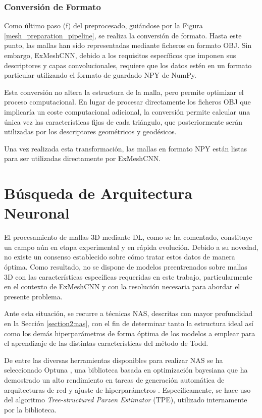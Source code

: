 \subsubsection{Conversión de Formato}
Como último paso (f) del preprocesado, guiándose por la Figura \ref{mesh_preparation_pipeline}, se realiza la conversión de formato. Hasta este punto, las mallas han sido representadas mediante ficheros en formato OBJ. Sin embargo, ExMeshCNN, debido a los requisitos específicos que imponen sus descriptores y capas convolucionales, requiere que los datos estén en un formato particular utilizando el formato de guardado NPY de NumPy.

Esta conversión no altera la estructura de la malla, pero permite optimizar el proceso computacional. En lugar de procesar directamente los ficheros OBJ que implicaría un coste computacional adicional, la conversión permite calcular una única vez las características fijas de cada triángulo, que posteriormente serán utilizadas por los descriptores geométricos y geodésicos.

Una vez realizada esta transformación, las mallas en formato NPY están listas para ser utilizadas directamente por ExMeshCNN.

\section{Búsqueda de Arquitectura Neuronal}
\label{section4:nas}
El procesamiento de mallas 3D mediante DL, como se ha comentado, constituye un campo aún en etapa experimental y en rápida evolución. Debido a su novedad, no existe un consenso establecido sobre cómo tratar estos datos de manera óptima. Como resultado, no se dispone de modelos preentrenados sobre mallas 3D con las características específicas requeridas en este trabajo, particularmente en el contexto de ExMeshCNN y con la resolución necesaria para abordar el presente problema.

Ante esta situación, se recurre a técnicas NAS, descritas con mayor profundidad en la Sección \ref{section2:nas}, con el fin de determinar tanto la estructura ideal así como los demás hiperparámetros de forma óptima de los modelos a emplear para el aprendizaje de las distintas características del método de Todd.

De entre las diversas herramientas disponibles para realizar NAS se ha seleccionado Optuna \cite{optuna_2019}, una biblioteca basada en optimización bayesiana que ha demostrado un alto rendimiento en tareas de generación automática de arquitecturas de red y ajuste de hiperparámetros \cite{pizurica_generic_2024}. Específicamente, se hace uso del algoritmo \textit{Tree-structured Parzen Estimator} (TPE), utilizado internamente por la biblioteca. 

